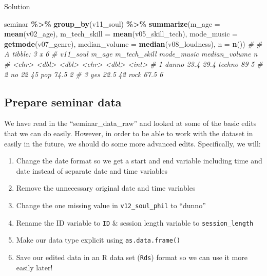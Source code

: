 \documentclass[
]{book}
\newenvironment{Shaded}{\begin{snugshade}}{\end{snugshade}}
\newcommand{\AttributeTok}[1]{\textcolor[rgb]{0.13,0.29,0.53}{#1}}
\newcommand{\CommentTok}[1]{\textcolor[rgb]{0.56,0.35,0.01}{\textit{#1}}}
\newcommand{\FunctionTok}[1]{\textcolor[rgb]{0.13,0.29,0.53}{\textbf{#1}}}
\newcommand{\NormalTok}[1]{#1}
\newcommand{\SpecialCharTok}[1]{\textcolor[rgb]{0.81,0.36,0.00}{\textbf{#1}}}
\providecommand{\tightlist}{%
  \setlength{\itemsep}{0pt}\setlength{\parskip}{0pt}}
\begin{document}
Solution

\begin{Shaded}
\begin{Highlighting}[]
\NormalTok{seminar }\SpecialCharTok{\%\textgreater{}\%} 
  \FunctionTok{group\_by}\NormalTok{(v11\_soul) }\SpecialCharTok{\%\textgreater{}\%} 
  \FunctionTok{summarize}\NormalTok{(}\AttributeTok{m\_age =} \FunctionTok{mean}\NormalTok{(v02\_age),}
            \AttributeTok{m\_tech\_skill =} \FunctionTok{mean}\NormalTok{(v05\_skill\_tech),}
            \AttributeTok{mode\_music =} \FunctionTok{getmode}\NormalTok{(v07\_genre),}
            \AttributeTok{median\_volume =} \FunctionTok{median}\NormalTok{(v08\_loudness),}
            \AttributeTok{n =} \FunctionTok{n}\NormalTok{())}
\CommentTok{\# \# A tibble: 3 x 6}
\CommentTok{\#   v11\_soul m\_age m\_tech\_skill mode\_music median\_volume     n}
\CommentTok{\#   \textless{}chr\textgreater{}    \textless{}dbl\textgreater{}        \textless{}dbl\textgreater{} \textless{}chr\textgreater{}              \textless{}dbl\textgreater{} \textless{}int\textgreater{}}
\CommentTok{\# 1 dunno     23.4         29.4 techno              89       5}
\CommentTok{\# 2 no        22           45   pop                 74.5     2}
\CommentTok{\# 3 yes       22.5         42   rock                67.5     6}
\end{Highlighting}
\end{Shaded}

\subsection*{Prepare seminar data}\label{prepare-seminar-data}

We have read in the ``seminar\_data\_raw'' and looked at some of the basic edits that we can do easily.
However, in order to be able to work with the dataset in easily in the future, we should do some more advanced edits.
Specifically, we will:

\begin{enumerate}
\def\labelenumi{\arabic{enumi}.}
\tightlist
\item
  Change the date format so we get a start and end variable including time and date instead of separate date and time variables
\item
  Remove the unnecessary original date and time variables
\item
  Change the one missing value in \texttt{v12\_soul\_phil} to ``dunno''
\item
  Rename the ID variable to \texttt{ID} \& session length variable to \texttt{session\_length}
\item
  Make our data type explicit using \texttt{as.data.frame()}
\item
  Save our edited data in an R data set (\texttt{Rds}) format so we can use it more easily later!
\end{enumerate}
\end{document}
